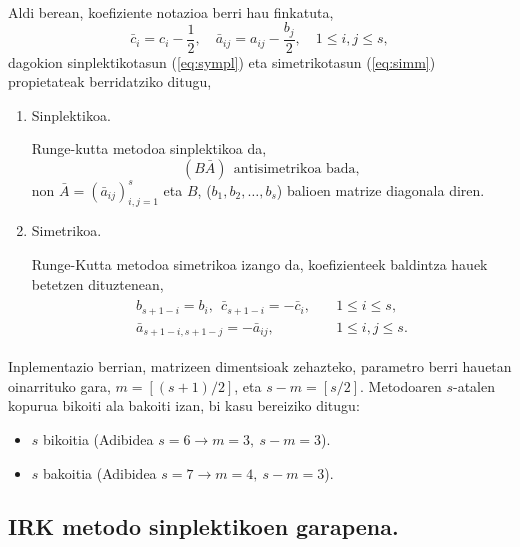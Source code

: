 \paragraph*{}Aldi berean, koefiziente notazioa berri hau finkatuta,
\begin{equation*}
\bar{c}_i=c_i-\frac{1}{2}, \quad \bar{a}_{ij}=a_{ij}-\frac{b_j}{2}, \quad 1\leqslant i,j \leqslant s,
\end{equation*}
dagokion sinplektikotasun (\ref{eq:sympl}) eta simetrikotasun (\ref{eq:simm}) propietateak berridatziko ditugu,
\begin{enumerate}
\item {Sinplektikoa.}

Runge-kutta metodoa sinplektikoa da,
\begin{equation}
\label{eq:eqlineala}
(B \bar{A}) \ \ \mbox{antisimetrikoa bada},
\end{equation}
non $\bar{A}=(\bar{a}_{ij})_{i,j=1}^s$ eta $B$, ($b_1,b_2,\dots,b_s$) balioen matrize diagonala diren.

\item {Simetrikoa.}

Runge-Kutta metodoa simetrikoa izango da, koefizienteek baldintza hauek betetzen dituztenean,
\begin{align}
\label{eq:simm2}
\begin{split}
b_{s+1-i}=b_i, \ \ \bar{c}_{s+1-i}=-\bar{c}_i,& \quad 1\leq i \leq s, \\
\bar{a}_{s+1-i,s+1-j}=-\bar{a}_{ij},& \quad 1\leq i,j \leq s. 
\end{split}
\end{align} 

\end{enumerate}

Inplementazio berrian, matrizeen dimentsioak zehazteko, parametro berri hauetan oinarrituko gara,
$m=[(s+1)/2]$, eta $s-m =[s/2]$. Metodoaren $s$-atalen kopurua bikoiti ala bakoiti izan, bi kasu bereiziko ditugu:
\begin{itemize}
\item $s$ bikoitia (Adibidea $s=6 \rightarrow m=3,\ s-m=3$).
\item $s$ bakoitia (Adibidea $s=7 \rightarrow m=4,\ s-m=3$).
\end{itemize}

\subsection{IRK metodo sinplektikoen garapena.}
\label{ss:733}

